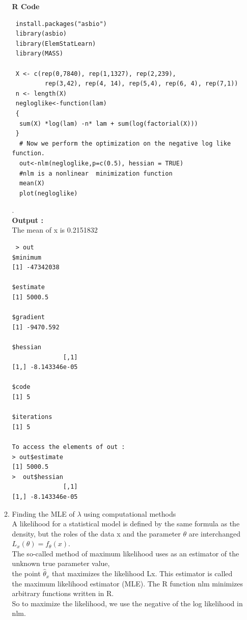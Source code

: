 \documentclass[11pt]{article}
\begin{document}
\begin{enumerate}
\begin{enumerate}
 
 \textbf {R Code}\\
 \begin{verbatim}
 install.packages("asbio")
 library(asbio)
 library(ElemStatLearn)
 library(MASS)

 X <- c(rep(0,7840), rep(1,1327), rep(2,239), 
         rep(3,42), rep(4, 14), rep(5,4), rep(6, 4), rep(7,1)) 
 n <- length(X) 
 negloglike<-function(lam) 
 { 
  sum(X) *log(lam) -n* lam + sum(log(factorial(X))) 
 }
  # Now we perform the optimization on the negative log like function. 
  out<-nlm(negloglike,p=c(0.5), hessian = TRUE) 
  #nlm is a nonlinear  minimization function
  mean(X)
  plot(negloglike)
\end{verbatim}

.\\
\textbf {Output : }\\
 The mean of x is 0.2151832\\
\begin{verbatim}
 > out
$minimum
[1] -47342038

$estimate
[1] 5000.5

$gradient
[1] -9470.592

$hessian
              [,1]
[1,] -8.143346e-05

$code
[1] 5

$iterations
[1] 5

To access the elements of out :
> out$estimate
[1] 5000.5
>  out$hessian
              [,1]
[1,] -8.143346e-05
\end{verbatim}





\item Finding the MLE of $ \lambda $ using computational methods\\

A likelihood for a statistical model is defined by the same formula as the density,
 but the roles of the data x and the parameter $ \theta $ are interchanged\\
${L_x}(\theta) = f_{\theta}(x).$ \\
The so-called method of maximum likelihood uses as an estimator of the unknown true parameter value,\\
 the point $ {\hat\theta_{x}}$ that maximizes the likelihood Lx.
This estimator is called the maximum likelihood estimator (MLE).
The R function nlm minimizes arbitrary functions written in R. \\
So to maximize the likelihood, we use the negative of the log likelihood in nlm.


\end{enumerate}
\end{enumerate}
\end{document}
